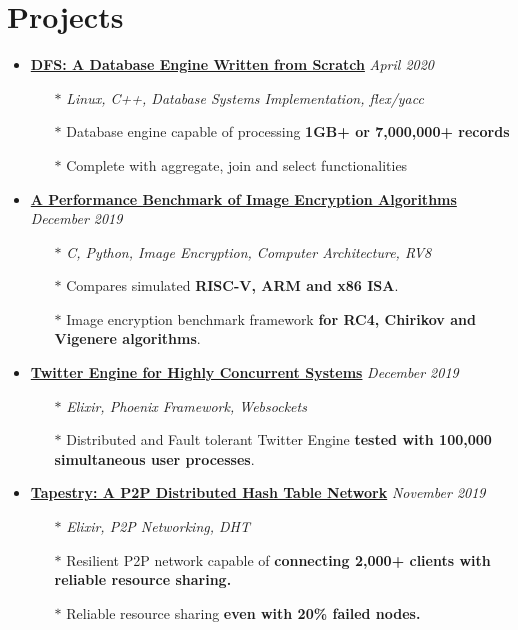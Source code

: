 \documentclass[10pt,a4paper]{article}
\begin{document}
\section{{\faCoffee} Projects}
	\begin{itemize}[noitemsep,nolistsep]

		\item{\textbf{\href{https://github.com/r0ck3r008/database-from-scratch}{DFS: A Database Engine Written from Scratch}} \hfill \textit{April 2020}}
			\begin{itemize}[leftmargin=*]
				\setlength\itemsep{-0.25em}
				\item[$\ast$]{\textit{Linux, C++, Database Systems Implementation, flex/yacc}}
				\item[$\ast$]{Database engine capable of processing \textbf{1GB+ or 7,000,000+ records}}
				\item[$\ast$]{Complete with aggregate, join and select functionalities}
			\end{itemize}

		\item{\textbf{\href{https://github.com/r0ck3r008/arch-perf-benchmark}{A Performance Benchmark of Image Encryption Algorithms}} \hfill \textit{December 2019}}
			\begin{itemize}[leftmargin=*]
				\setlength\itemsep{-0.25em}
				\item[$\ast$]{\textit{C, Python, Image Encryption, Computer Architecture, RV8}}
				\item[$\ast$]{Compares simulated \textbf{RISC-V, ARM and x86 ISA}.}
				\item[$\ast$]{Image encryption benchmark framework \textbf{for RC4, Chirikov and Vigenere algorithms}.}
			\end{itemize}

		\item{\textbf{\href{https://github.com/r0ck3r008/twitter-engine}{Twitter Engine for Highly Concurrent Systems}} \hfill \textit{December 2019}}
			\begin{itemize}[leftmargin=*]
				\setlength\itemsep{-0.25em}
				\item[$\ast$]{\textit{Elixir, Phoenix Framework, Websockets}}
				\item[$\ast$]{Distributed and Fault tolerant Twitter Engine \textbf{tested with 100,000 simultaneous user processes}.}
			\end{itemize}

		\item{\textbf{\href{https://github.com/r0ck3r008/tapestry\_p2p}{Tapestry: A P2P Distributed Hash Table Network}} \hfill \textit{November 2019}}
			\begin{itemize}[leftmargin=*]
				\setlength\itemsep{-0.25em}
				\item[$\ast$]{\textit{Elixir, P2P Networking, DHT}}
				\item[$\ast$]{Resilient P2P network capable of \textbf{connecting 2,000+ clients with reliable resource sharing.}}
				\item[$\ast$]{Reliable resource sharing \textbf{even with 20\% failed nodes.}}
			\end{itemize}

	\end{itemize}
\end{document}
